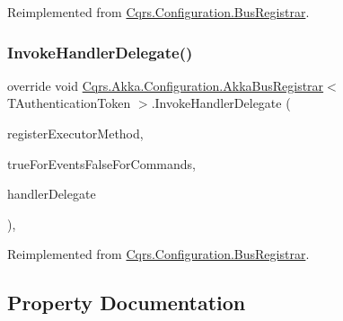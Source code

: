 Reimplemented from \hyperlink{classCqrs_1_1Configuration_1_1BusRegistrar_a07d27088739f2ae0ac7c551fc6a72ac9}{Cqrs.\+Configuration.\+Bus\+Registrar}.

\mbox{\label{classCqrs_1_1Akka_1_1Configuration_1_1AkkaBusRegistrar_a0ac474751b2ba8ebb27b885a15fbf053}} 
\subsubsection{\texorpdfstring{Invoke\+Handler\+Delegate()}{InvokeHandlerDelegate()}}
{\footnotesize\ttfamily override void \hyperlink{classCqrs_1_1Akka_1_1Configuration_1_1AkkaBusRegistrar}{Cqrs.\+Akka.\+Configuration.\+Akka\+Bus\+Registrar}$<$ T\+Authentication\+Token $>$.Invoke\+Handler\+Delegate (\begin{DoxyParamCaption}\item[{Method\+Info}]{register\+Executor\+Method,  }\item[{bool}]{true\+For\+Events\+False\+For\+Commands,  }\item[{\hyperlink{classCqrs_1_1Configuration_1_1HandlerDelegate}{Handler\+Delegate}}]{handler\+Delegate }\end{DoxyParamCaption})\hspace{0.3cm}{\ttfamily [protected]}, {\ttfamily [virtual]}}



Reimplemented from \hyperlink{classCqrs_1_1Configuration_1_1BusRegistrar_a3103da4cf077104607fe03a862958827}{Cqrs.\+Configuration.\+Bus\+Registrar}.



\subsection{Property Documentation}
\mbox{\label{classCqrs_1_1Akka_1_1Configuration_1_1AkkaBusRegistrar_a642cd7215c2f51cfaff263f9ba95a4c4}} 
